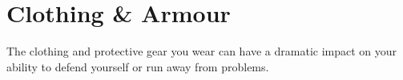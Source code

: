 \chapter{Clothing \& Armour} \label{S:Armour}

The clothing and protective gear you wear can have a dramatic impact on your ability to defend yourself\comma{} or run away from problems. 






	


